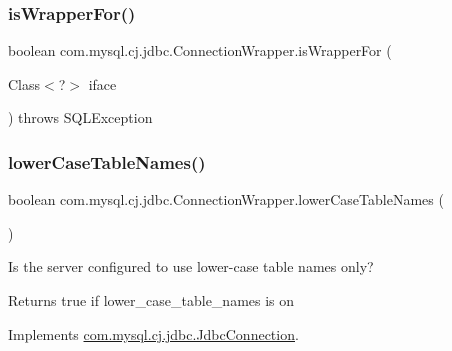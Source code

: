 \mbox{\label{classcom_1_1mysql_1_1cj_1_1jdbc_1_1_connection_wrapper_ac14829a027ea405b81e44c480deadf87}} 
\subsubsection{\texorpdfstring{is\+Wrapper\+For()}{isWrapperFor()}}
{\footnotesize\ttfamily boolean com.\+mysql.\+cj.\+jdbc.\+Connection\+Wrapper.\+is\+Wrapper\+For (\begin{DoxyParamCaption}\item[{Class$<$?$>$}]{iface }\end{DoxyParamCaption}) throws S\+Q\+L\+Exception}

\mbox{\label{classcom_1_1mysql_1_1cj_1_1jdbc_1_1_connection_wrapper_aba2642633d16efa8be0fd109c0fa9747}} 
\subsubsection{\texorpdfstring{lower\+Case\+Table\+Names()}{lowerCaseTableNames()}}
{\footnotesize\ttfamily boolean com.\+mysql.\+cj.\+jdbc.\+Connection\+Wrapper.\+lower\+Case\+Table\+Names (\begin{DoxyParamCaption}{ }\end{DoxyParamCaption})}

Is the server configured to use lower-\/case table names only?

\begin{DoxyReturn}{Returns}
true if lower\+\_\+case\+\_\+table\+\_\+names is \textquotesingle{}on\textquotesingle{} 
\end{DoxyReturn}


Implements \mbox{\hyperlink{interfacecom_1_1mysql_1_1cj_1_1jdbc_1_1_jdbc_connection_a54cca6407a1a531b8e65ee3d965a51cd}{com.\+mysql.\+cj.\+jdbc.\+Jdbc\+Connection}}.


